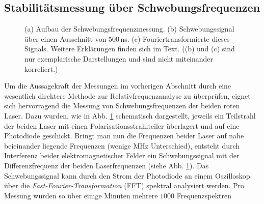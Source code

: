 \subsection{Stabilitätsmessung über
Schwebungsfrequenzen}\label{subsec:beatfrequenzmessung}
\begin{figure}[hp]
 	\centering
 	\footnotesize
	\caption[Schwebungsfrequenzmessung]{(a) Aufbau der
	Schwebungsfrequenzmessung. (b) Schwebungssignal über einen
	Ausschnitt von $500\,$ns. (c) Fouriertransformierte dieses
	Signals. Weitere Erklärungen finden sich im Text. ((b) und (c) sind nur
	exemplarische Darstellungen und sind nicht miteinander korreliert.)}
	\label{fig:beatfrequenzmessung}
\end{figure}
Um die Aussagekraft der Messungen im vorherigen Abschnitt durch eine wesentlich
direktere Methode zur Relativfrequenzanalyse zu überprüfen, eignet sich hervorragend die
Messung von Schwebungsfrequenzen der beiden roten Laser. Dazu wurden, wie in
Abb.
\ref{fig:beatfrequenzmessung}
schematisch dargestellt, jeweils ein Teilstrahl der beiden Laser mit einen
Polarisationsstrahlteiler überlagert und auf eine Photodiode geschickt. Bringt man nun die Frequenzen
beider Laser auf nahe beieinander liegende Frequenzen (wenige MHz
Unterschied), entsteht durch Interferenz beider
elektromagnetischer Felder ein Schwebungssignal mit der Differenzfrequenz der
beiden Laserfrequenzen (siehe Abb.
\ref{fig:beatfrequenzmessung}). Das
Schwebungssignal kann durch den Strom der Photodiode an einem Oszilloskop über
die \textit{Fast-Fourier-Transformation} (FFT) spektral analysiert werden. Pro
Messung wurden so über einige Minuten mehrere $1000$ Frequenzspektren
